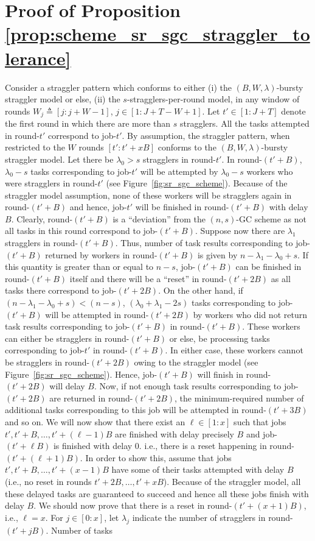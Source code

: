\section{Proof of Proposition \ref{prop:scheme_sr_sgc_straggler_tolerance}}\label{app:proof_scheme_B_straggler_tolerance}

Consider a straggler pattern which conforms to either (i) the $(B,W,\lambda)$-bursty straggler model or else, (ii) the $s$-stragglers-per-round model, in any window of rounds $W_j\triangleq[j:j+W-1]$, $j\in[1:J+T-W+1]$. Let $t'\in[1:J+T]$ denote the first round in which there are more than $s$ stragglers. All the tasks attempted in round-$t'$ correspond to job-$t'$. By assumption, the straggler pattern, when restricted to the $W$ rounds $[t':t'+xB]$ conforms to the $(B,W,\lambda)$-bursty straggler model. Let there be $\lambda_0>s$ stragglers in round-$t'$. In round-$(t'+B)$, $\lambda_0-s$ tasks corresponding to job-$t'$ will be attempted by $\lambda_0-s$ workers who were stragglers in round-$t'$ (see Figure~\ref{fig:sr_sgc_scheme}). Because of the straggler model assumption, none of these workers will be stragglers again in round-$(t'+B)$ and hence, job-$t'$ will be finished in round-$(t'+B)$ with delay $B$. Clearly, round-$(t'+B)$ is a ``deviation'' from the $(n,s)$-GC scheme as not all tasks in this round correspond to job-$(t'+B)$. Suppose now there are $\lambda_1$ stragglers in round-$(t'+B)$. Thus, number of task results corresponding to job-$(t'+B)$ returned by workers in round-$(t'+B)$ is given by $n-\lambda_1-\lambda_0+s$. If this quantity is greater than or equal to $n-s$, job-$(t'+B)$ can be finished in round-$(t'+B)$ itself and there will be a ``reset'' in round-$(t'+2B)$ as all tasks there correspond to job-$(t'+2B)$. On the other hand, if $(n-\lambda_1-\lambda_0+s)<(n-s)$, $(\lambda_0+\lambda_1-2s)$ tasks corresponding to job-$(t'+B)$ will be attempted in round-$(t'+2B)$ by workers who did not return task results corresponding to job-$(t'+B)$ in round-$(t'+B)$. These workers can either be stragglers in round-$(t'+B)$ or else, be processing tasks corresponding to job-$t'$ in round-$(t'+B)$. In either case, these workers cannot be stragglers in round-$(t'+2B)$ owing to the straggler model (see Figure~\ref{fig:sr_sgc_scheme}). Hence, job-$(t'+B)$ will finish in round-$(t'+2B)$ will delay $B$. Now, if not enough task results corresponding to job-$(t'+2B)$ are returned in round-$(t'+2B)$, the minimum-required number of additional tasks corresponding to this job will be attempted in round-$(t'+3B)$ and so on. We will now show that there exist an $\ell\in[1:x]$ such that jobs $t',t'+B,\ldots,t'+(\ell-1)B$ are finished with delay precisely $B$ and job-$(t'+\ell B)$ is finished with delay $0$. i.e., there is a reset happening in round-$(t'+(\ell+1)B)$. In order to show this, assume that jobs $t',t'+B,\ldots,t'+(x-1)B$ have some of their tasks attempted with delay $B$ (i.e., no reset in rounds $t'+2B,\ldots,t'+xB$). Because of the straggler model, all these delayed tasks are guaranteed to succeed and hence all these jobs finish with delay $B$. We should now prove that there is a reset in round-$(t'+(x+1)B)$, i.e., $\ell=x$. For $j\in[0:x]$, let $\lambda_j$ indicate the number of stragglers in round-$(t'+jB)$. Number of tasks 